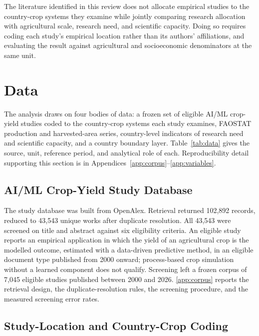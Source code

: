 \documentclass[ASNA,twocolumn]{USG}
\begin{document}
The literature identified in this review does not allocate empirical studies to the country-crop systems they examine while jointly
comparing research allocation with agricultural scale, research need, and scientific capacity. Doing so requires coding each
study's empirical location rather than its authors' affiliations, and evaluating the result
against agricultural and socioeconomic denominators at the same unit.


\section{Data}

The analysis draws on four bodies of data: a frozen set of eligible AI/ML crop-yield studies
coded to the country-crop systems each study examines, FAOSTAT production and harvested-area
series, country-level indicators of research need and scientific capacity, and a country
boundary layer. Table~\ref{tab:data} gives the source, unit, reference period, and analytical
role of each. Reproducibility detail supporting this section is in
Appendices~\ref{app:corpus}--\ref{app:variables}.

\subsection{AI/ML Crop-Yield Study Database}

The study database was built from OpenAlex. Retrieval returned 102,892 records, reduced to
43,543 unique works after duplicate resolution. All 43,543 were screened on title and
abstract against six eligibility criteria. An eligible study reports an empirical application in which the
yield of an agricultural crop is the modelled outcome, estimated with a data-driven
predictive method, in an eligible document type published from 2000 onward; process-based
crop simulation without a learned component does not qualify. Screening left a frozen corpus
of 7,045 eligible studies published between 2000 and 2026. \ref{app:corpus} reports
the retrieval design, the duplicate-resolution rules, the screening procedure, and the
measured screening error rates.

\subsection{Study-Location and Country-Crop Coding}
\end{document}

